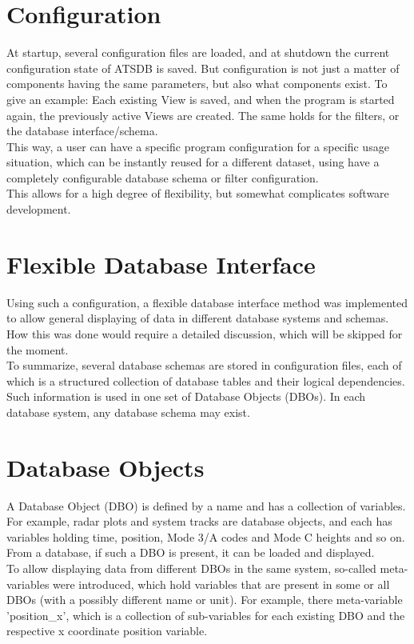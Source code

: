 \documentclass[10pt,letterpaper,extrafontsizes]{memoir}
\begin{document}
\section*{Configuration}
At startup, several configuration files are loaded, and at shutdown the current configuration state of ATSDB is saved.  But configuration is not just a matter of components having the same parameters, but also what components exist. To give an example: Each existing View is saved, and when the program is started again, the previously active Views are created.  The same holds for the filters, or the database interface/schema. \\
This way, a user can have a specific program configuration for a specific usage situation, which can be instantly reused for a different dataset, using have a completely configurable database schema or filter configuration. \\
This allows for a high degree of flexibility, but somewhat complicates software development.

\section*{Flexible Database Interface}
Using such a configuration, a flexible database interface method was implemented to allow general displaying of data in different database systems and schemas.  How this was done would require a detailed discussion, which will be skipped for the moment.\\
To summarize, several database schemas are stored in configuration files, each of which is a structured collection of database tables and their logical dependencies. Such information is used in one set of Database Objects (DBOs). In each database system, any database schema may exist.

\section*{Database Objects}
A Database Object (DBO) is defined by a name and has a collection of variables. For example, radar plots and system tracks are database objects, and each has variables holding time, position, Mode 3/A codes and Mode C heights and so on. From a database, if such a DBO is present, it can be loaded and displayed.\\

To allow displaying data from different DBOs in the same system, so-called meta-variables were  introduced, which hold variables that are present in some or all DBOs (with a possibly different name or unit).  For example, there meta-variable 'position\_x', which is a collection of sub-variables for each existing DBO and the respective x coordinate position variable.
\end{document}
